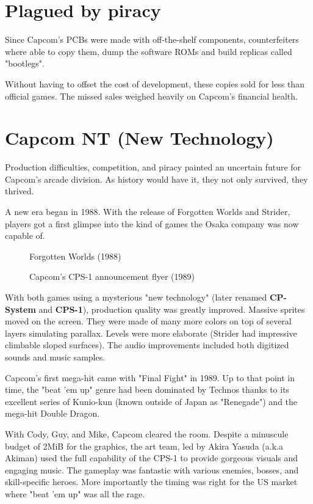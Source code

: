 \section{Plagued by piracy}
Since Capcom's PCBs were made with off-the-shelf components, counterfeiters where able to copy them, dump the software ROMs and build replicas called "bootlegs". 

Without having to offset the cost of development, these copies sold for less than official games. The missed sales weighed heavily on Capcom's financial health. 




\section{Capcom NT (New Technology)}
Production difficulties, competition, and piracy painted an uncertain future for Capcom's arcade division. As history would have it, they not only survived, they thrived.

A new era began in 1988. With the release of Forgotten Worlds and Strider, players got a first glimpse into the kind of games the Osaka company was now capable of.  



\label{nin_fw}
\begin{figure}[H]
\caption*{Forgotten Worlds (1988)}
\end{figure}



 
\label{fw_flyer}
  \begin{figure}[H]
  \caption*{Capcom's CPS-1 announcement flyer (1989)}
  \end{figure}

With both games using a mysterious "new technology" (later renamed \textbf{CP-System} and \textbf{CPS-1}), production quality was greatly improved. Massive sprites moved on the screen. They were made of many more colors on top of several layers simulating parallax. Levels were more elaborate (Strider had impressive climbable sloped surfaces). The audio improvements included both digitized sounds and music samples.

Capcom's first mega-hit came with "Final Fight" in 1989. Up to that point in time, the "beat 'em up" genre had been dominated by Technos thanks to its excellent series of Kunio-kun (known outside of Japan as "Renegade") and the mega-hit Double Dragon. 

With Cody, Guy, and Mike, Capcom cleared the room. Despite a minuscule budget of 2MiB for the graphics, the art team, led by Akira Yasuda (a.k.a Akiman) used the full capability of the CPS-1 to provide gorgeous visuals and engaging music. The gameplay was fantastic with various enemies, bosses, and skill-specific heroes. More importantly the timing was right for the US market where "beat 'em up" was all the rage.



